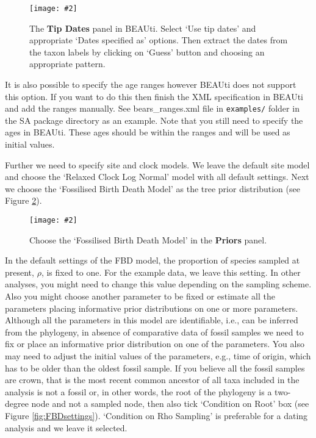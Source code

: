 \documentclass[12pt]{article}
\newcommand{\includeimage}[2][]{%
\texttt{[image: \#2]}
}
\begin{document}
\begin{figure}	
\centering
\includeimage[width=\textwidth]{figures/TipDates}
\caption{The {\bf Tip Dates} panel in BEAUti. Select `Use tip dates' and appropriate `Dates specified as' options. Then extract the dates from the taxon labels by clicking on `Guess' button and choosing an appropriate pattern.\label{fig:tipDates}}

\end{figure}
It is also possible to specify the age ranges however BEAUti does not support this option. If you want to do this then finish the XML specification in BEAUti and add the ranges manually.  See bears\_ranges.xml file in {\tt examples/} folder in the SA package directory as an example. Note that you still need to specify the ages in BEAUti. These ages should be within the ranges and will be used as initial values. 

Further we need to specify site and clock models. We leave the default site model and choose the `Relaxed Clock Log Normal' model with all default settings. Next we choose the `Fossilised Birth Death Model' as the tree prior distribution (see Figure \ref{fig:FBDmodel}).

\begin{figure}	
\centering
\includeimage[width=\textwidth]{figures/FBDmodel}
\caption{Choose the `Fossilised Birth Death Model' in the {\bf Priors} panel. \label{fig:FBDmodel}}
\end{figure}

In the default settings of the FBD model, the proportion of species sampled at present, $\rho$, is fixed to one. For the example data, we leave this setting. In other analyses, you might need to change this value depending on the sampling scheme. Also you might choose another parameter to be fixed or estimate all the parameters placing informative prior distributions on one or more parameters. Although all the parameters in this model are identifiable, i.e., can be inferred from the phylogeny, in absence of comparative data of fossil samples we need to fix or place an informative prior distribution on one of the parameters.  You also may need to adjust the initial values of the parameters, e.g.,  time of origin, which has to be older than the oldest fossil sample. If you believe all the fossil samples are crown, that is the most recent common ancestor of all taxa included in the analysis is not a fossil or, in other words, the root of the phylogeny is a two-degree node and not a sampled node, then also tick `Condition on Root' box (see Figure \ref{fig:FBDsettings}). `Condition on Rho Sampling' is preferable for a dating analysis and we leave it selected. 
\end{document}
